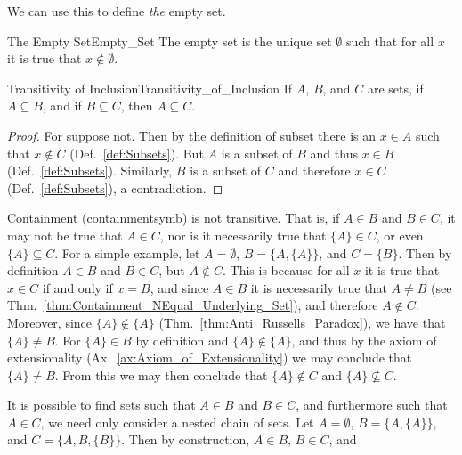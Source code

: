         We can use this to define \textit{the} empty set.
        \begin{fdefinition}{The Empty Set}{Empty_Set}
            The \gls{empty set} is the unique \gls{set} $\emptyset$ such that
            for all $x$ it is true that $x\notin\emptyset$.
        \end{fdefinition}
        \begin{ltheorem}{Transitivity of Inclusion}{Transitivity_of_Inclusion}
            If $A$, $B$, and $C$ are sets, if $A\subseteq{B}$, and if
            $B\subseteq{C}$, then $A\subseteq{C}$.
        \end{ltheorem}
        \begin{proof}
            For suppose not. Then by the definition of subset there is an
            $x\in{A}$ such that $x\notin{C}$ (Def.~\ref{def:Subsets}). But $A$
            is a subset of $B$ and thus $x\in{B}$ (Def.~\ref{def:Subsets}).
            Similarly, $B$ is a subset of $C$ and therefore $x\in{C}$
            (Def.~\ref{def:Subsets}), a contradiction.
        \end{proof}
        Containment (\gls{containmentsymb}) is not transitive. That is, if
        $A\in{B}$ and $B\in{C}$, it may not be true that $A\in{C}$, nor is it
        necessarily true that $\{A\}\in{C}$, or even $\{A\}\subseteq{C}$. For a
        simple example, let $A=\emptyset$, $B=\{A,\{A\}\}$, and
        $C=\{B\}$. Then by definition $A\in{B}$ and $B\in{C}$, but $A\notin{C}$.
        This is because for all $x$ it is true that $x\in{C}$ if and only if
        $x=B$, and since $A\in{B}$ it is necessarily true that $A\ne{B}$
        (see Thm.~\ref{thm:Containment_NEqual_Underlying_Set}), and therefore
        $A\notin{C}$. Moreover, since $\{A\}\notin\{A\}$
        (Thm.~\ref{thm:Anti_Russells_Paradox}), we have that $\{A\}\ne{B}$.
        For $\{A\}\in{B}$ by definition and $\{A\}\notin\{A\}$, and thus by
        the axiom of extensionality (Ax.~\ref{ax:Axiom_of_Extensionality}) we
        may conclude that $\{A\}\ne{B}$. From this we may then conclude that
        $\{A\}\notin{C}$ and $\{A\}\nsubseteq{C}$.
        \par\hfill\par
        It is possible to find sets such that $A\in{B}$ and $B\in{C}$, and
        furthermore such that $A\in{C}$, we need only consider a nested chain
        of sets. Let $A=\emptyset$, $B=\{A,\{A\}\}$, and
        $C=\{A,B,\{B\}\}$. Then by construction, $A\in{B}$, $B\in{C}$, and

